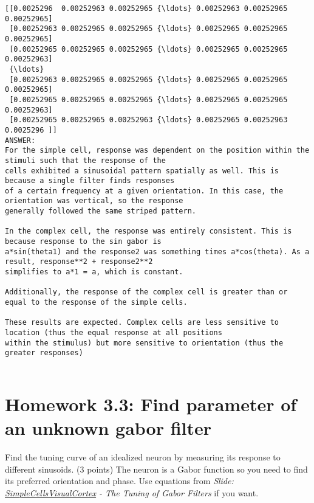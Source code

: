 \documentclass[11pt]{article}
\begin{document}
    \begin{Verbatim}[commandchars=\\\{\}]
[[0.0025296  0.00252963 0.00252965 {\ldots} 0.00252963 0.00252965 0.00252965]
 [0.00252963 0.00252965 0.00252965 {\ldots} 0.00252965 0.00252965 0.00252965]
 [0.00252965 0.00252965 0.00252965 {\ldots} 0.00252965 0.00252965 0.00252963]
 {\ldots}
 [0.00252963 0.00252965 0.00252965 {\ldots} 0.00252965 0.00252965 0.00252965]
 [0.00252965 0.00252965 0.00252965 {\ldots} 0.00252965 0.00252965 0.00252963]
 [0.00252965 0.00252965 0.00252963 {\ldots} 0.00252965 0.00252963 0.0025296 ]]
ANSWER:
For the simple cell, response was dependent on the position within the stimuli such that the response of the 
cells exhibited a sinusoidal pattern spatially as well. This is because a single filter finds responses
of a certain frequency at a given orientation. In this case, the orientation was vertical, so the response
generally followed the same striped pattern.

In the complex cell, the response was entirely consistent. This is because response to the sin gabor is
a*sin(theta1) and the response2 was something times a*cos(theta). As a result, response**2 + response2**2
simplifies to a*1 = a, which is constant.

Additionally, the response of the complex cell is greater than or equal to the response of the simple cells.

These results are expected. Complex cells are less sensitive to location (thus the equal response at all positions
within the stimulus) but more sensitive to orientation (thus the greater responses)


    \end{Verbatim}

    \section{Homework 3.3: Find parameter of an unknown gabor
filter}\label{homework-3.3-find-parameter-of-an-unknown-gabor-filter}

Find the tuning curve of an idealized neuron by measuring its response
to different sinusoids. (3 points) The neuron is a Gabor function so you
need to find its preferred orientation and phase. Use equations from
\emph{Slide:
\href{https://cs.jhu.edu/~ayuille/JHUcourses/ProbabilisticModelsOfVisualCognition2017/Lecture3SimpleCells/SimpleCellsVisualCortex.pdf}{SimpleCellsVisualCortex}
- The Tuning of Gabor Filters } if you want.
\end{document}
